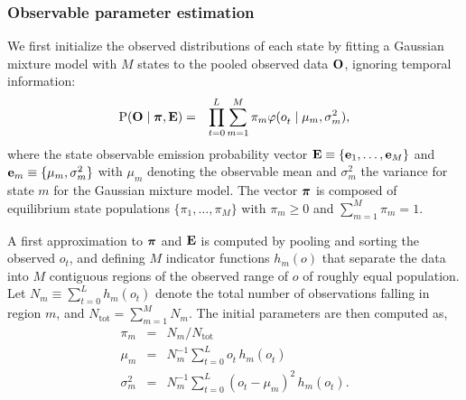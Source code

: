 \documentclass[aps,pre,twocolumn,superscriptaddress,nofootinbib,longbibliography]{revtex4-1}
\newcommand{\bfv}[1]{{\mbox{\boldmath{$#1$}}}}
\newcommand{\bfm}[1]{{\bf #1}}
\renewcommand{\Pr}{\mathrm{P}}
\begin{document}
{%

\subsubsection{Observable parameter estimation}

We first initialize the observed distributions of each state by fitting a Gaussian mixture model with $M$ states to the pooled observed data $\bfm{O}$, ignoring temporal information:
\begin{eqnarray}
\Pr(\bfm{O} \mid \bfv{\pi}, \bfm{E}) &=& \prod_{t=0}^{L^{}} \sum_{m=1}^M \pi_m \varphi(o^{}_{t} \mid \mu_m, \sigma^2_m) ,
\label{equation:gaussian-mixture-likelihood}
\end{eqnarray}
where the state observable emission probability vector $\bfm{E} \equiv \{\bfm{e}_1,\ldots,\bfm{e}_M\}$ and $\bfm{e}_m \equiv \{\mu_m, \sigma_m^2\}$ with $\mu_m$ denoting the observable mean and $\sigma_m^2$ the variance for state $m$ for the Gaussian mixture model.
The vector $\bfv{\pi}$ is composed of equilibrium state populations $\{ \pi_1, \ldots , \pi_M\}$ with $\pi_m \ge 0$ and $\sum_{m=1}^M \pi_m = 1$.

A first approximation to $\bfv{\pi}$ and $\bfm{E}$ is computed by pooling and sorting the observed $o^{}_{t}$, and defining $M$ indicator functions $h_m(o)$ that separate the data into $M$ contiguous regions of the observed range of $o$ of roughly equal population.
Let $N_m \equiv \sum_{t=0}^{L^{}} h_m(o^{}_{t})$ denote the total number of observations falling in region $m$, and $N_\mathrm{tot} = \sum_{m=1}^M N_m$.
The initial parameters are then computed as,
\begin{eqnarray}
\pi_m &=& N_m / N_\mathrm{tot} \nonumber \\
\mu_m &=& N_m^{-1} \sum_{t=0}^{L^{}} o^{}_{t} \, h_m(o^{}_{t}) \\
\sigma^2_m &=& N_m^{-1} \sum_{t=0}^{L^{}} (o^{}_{t} - \mu_m)^2 \, h_m(o^{}_{t}) .
\end{eqnarray}

}
\end{document}
